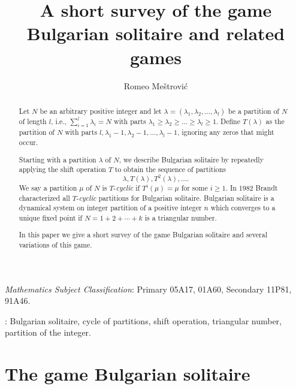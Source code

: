 \documentclass[oneside,12pt]{amsart}
\theoremstyle{definition}
\numberwithin{equation}{section}
\begin{document}
\title[]{A short survey  of the game Bulgarian solitaire and related games}

 


\author{Romeo Me\v strovi\' c}

\address{Maritime Faculty Kotor, University of Montenegro, Dobrota,
 85330 Kotor, Montenegro} 


  \begin{abstract}
Let $N$ be an arbitrary  positive integer and let 
$\lambda=(\lambda_1, \lambda_2,\ldots,\lambda_l)$ be a partition of $N$
of length $l$,  i.e., $\sum_{i=1}^{l}\lambda_i=N$
with parts $\lambda_1\ge \lambda_2\ge\ldots\ge \lambda_l\ge 1$.
 Define $T(\lambda)$ as the partition of $N$ with parts 
$l,\lambda_1-1, \lambda_2-1,\ldots,\lambda_l-1$, ignoring any
 zeros that might occur.


Starting with a partition $\lambda$ of $N$,
we describe Bulgarian solitaire by repeatedly applying the shift
operation $T$ to obtain the sequence of partitions
     $$
     \lambda, T(\lambda),T^2(\lambda),\ldots .
      $$
  We say a partition $\mu$ of $N$ is $T$-{\it cyclic} if $T^i(\mu)=\mu$
  for some $i\ge 1$. In 1982 Brandt \cite{br} characterized all  $T$-{\it cyclic}
  partitions for Bulgarian solitaire. Bulgarian solitaire is a dynamical 
system on integer partition of a positive integer $n$ which converges 
to a unique fixed point if $N=1+2+\cdots +k$ is a triangular number.

In this paper we give a  short survey  of the game Bulgarian solitaire
 and several variations of this  game.
   \end{abstract}

\maketitle

 {\it Mathematics Subject Classification}: 
 Primary 05A17,  01A60, Secondary 11P81, 91A46. 


\vspace*{1mm}

: 
Bulgarian solitaire, cycle of partitions,
shift operation, triangular number, partition of the integer. 
 \section{The game Bulgarian solitaire}



\vspace{2mm}
\end{document}
